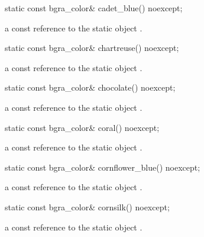 \begin{itemdecl}
static const bgra_color& cadet_blue() noexcept;
\end{itemdecl}
\begin{itemdescr}
\pnum
\returns
a const reference to the static  object .
\end{itemdescr}

\begin{itemdecl}
static const bgra_color& chartreuse() noexcept;
\end{itemdecl}
\begin{itemdescr}
\pnum
\returns
a const reference to the static  object .
\end{itemdescr}

\begin{itemdecl}
static const bgra_color& chocolate() noexcept;
\end{itemdecl}
\begin{itemdescr}
\pnum
\returns
a const reference to the static  object .
\end{itemdescr}

\begin{itemdecl}
static const bgra_color& coral() noexcept;
\end{itemdecl}
\begin{itemdescr}
\pnum
\returns
a const reference to the static  object .
\end{itemdescr}

\begin{itemdecl}
static const bgra_color& cornflower_blue() noexcept;
\end{itemdecl}
\begin{itemdescr}
\pnum
\returns
a const reference to the static  object .
\end{itemdescr}

\begin{itemdecl}
static const bgra_color& cornsilk() noexcept;
\end{itemdecl}
\begin{itemdescr}
\pnum
\returns
a const reference to the static  object .
\end{itemdescr}

